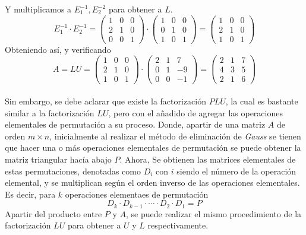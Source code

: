     Y multiplicamos a \(E_1^{-1}, E_2^{-2}\) para obtener a \(L\).
    \[
        E_1^{-1} \cdot E_2^{-1} =
        \begin{pmatrix}
            1 & 0 & 0 \\
            2 & 1 & 0 \\
            0 & 0 & 1
        \end{pmatrix}
        \cdot
        \begin{pmatrix}
            1 & 0 & 0 \\
            0 & 1 & 0 \\
            1 & 0 & 1
        \end{pmatrix}
        =
        \begin{pmatrix}
            1 & 0 & 0 \\
            2 & 1 & 0 \\
            1 & 0 & 1 
        \end{pmatrix}
    \]
    Obteniendo así, y verificando
    \[
        A = LU = 
        \begin{pmatrix}
            1 & 0 & 0 \\
            2 & 1 & 0 \\
            1 & 0 & 1 
        \end{pmatrix}
        \cdot 
        \begin{pmatrix}
            2 & 1 & 7 \\
            0 & 1 & -9 \\ 
            0 & 0 & -1 
        \end{pmatrix}
        =
        \begin{pmatrix}
            2 & 1 & 7 \\
            4 & 3 & 5 \\
            2 & 1 & 6
        \end{pmatrix}
    \]
    \\[0.5cm]
    Sin embargo, se debe aclarar que existe la factorización \(PLU\), la cual es bastante similar a la factorización \(LU\),
    pero con el añadido de agregar las operaciones elementales de permutación a su proceso. 
    Donde, apartir de una matriz \(A\) de orden \(m \times n\), inicialmente al realizar el método de eliminación de \emph{Gauss}
    se tienen que hacer una o más operaciones elementales de permutación se puede obtener la matriz triangular hacía abajo \(P\). 
    Ahora, Se obtienen las matrices elementales de estas permutaciones, denotadas como \(D_i\) con \(i\) siendo el número de la operación elemental, 
    y se multiplican según el orden inverso de las operaciones elementales.
    Es decir, para \(k\) operaciones elementaes de permutación
    \[
        D_k \cdot D_{k - 1} \cdot \cdots \cdot D_2 \cdot D_1 = P
    \]
    Apartir del producto entre \(P\) y \(A\), se puede realizar el mismo procedimiento de la factorización \(LU\) para obtener a \(U\) y \(L\) respectivamente.
